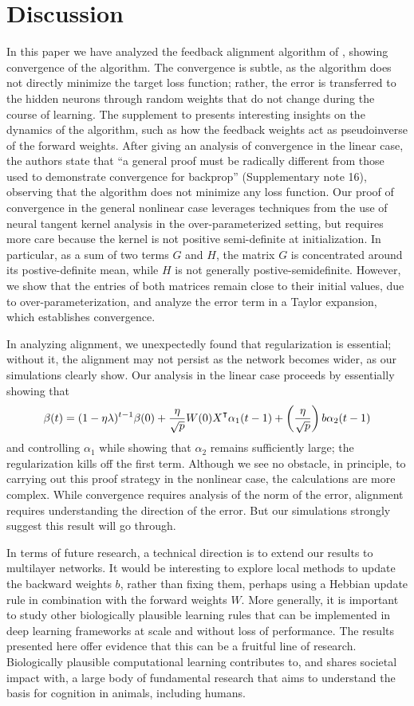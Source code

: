 \section{Discussion}

In this paper we have analyzed the feedback alignment algorithm of
\cite{lillicrap2016random}, showing convergence of the algorithm. The convergence is subtle, as the algorithm does not directly minimize the target loss function; rather, the error is transferred to the hidden neurons through random weights that do not change during the course of learning.
The supplement to \cite{lillicrap2016random} presents interesting insights on the dynamics of the algorithm, such as how the feedback weights act as pseudoinverse of the forward weights. After giving an analysis of convergence in the linear case, the authors state that
``a general proof must be radically different from those used to demonstrate convergence for backprop'' (Supplementary note 16), observing that the algorithm does not minimize any loss function. Our proof of convergence in the general nonlinear case leverages techniques from
the use of neural tangent kernel analysis in the over-parameterized setting, but requires more care because the kernel is not positive semi-definite at initialization. In particular, as a sum of two terms $G$ and $H$, the matrix $G$ is concentrated around its postive-definite mean, while $H$ is not generally postive-semidefinite. However, we show that the entries of both matrices remain close to their initial values, due to over-parameterization, and analyze the error term in a Taylor expansion, which establishes convergence.

In analyzing alignment, we unexpectedly found that regularization is essential; without it, the alignment may not persist as the network becomes wider, as our simulations clearly show.
Our analysis in the linear case proceeds by essentially showing that
$$\beta(t) = (1-\eta \lambda)^{t-1} \beta(0) + \frac{\eta}{\sqrt{p}} W(0) X\transpose \alpha_1(t-1) +
\left(\frac{\eta}{\sqrt{p}} \right) b \alpha_2(t-1)$$
and controlling $\alpha_1$ while showing that $\alpha_2$ remains sufficiently large; the
regularization kills off the first term.
Although we see no obstacle, in principle, to carrying out this proof strategy in the nonlinear
case, the calculations are more complex. While convergence requires analysis of the norm of the error, alignment requires understanding the direction of the error. But our simulations strongly suggest this result will go through.

In terms of future research, a technical direction is to extend our results to multilayer networks. It would be interesting to explore local methods to update the backward weights $b$, rather than fixing them, perhaps using a Hebbian update rule in combination with the forward weights $W$. More generally, it is important to study other biologically plausible learning rules that can be implemented in deep learning frameworks at scale and without loss of performance.  The results presented here offer evidence that this can be a fruitful line of research. Biologically plausible computational learning contributes to, and shares societal impact with, a large body of fundamental research that aims to understand the basis for cognition in animals, including humans.
